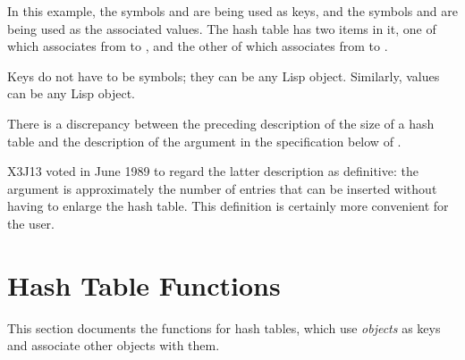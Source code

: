 In this example, the symbols  and  are being used as
keys, and the symbols  and  are being used as the
associated values.  The hash table has two items in it, one of which
associates from  to , and the other of which
associates from  to .

Keys do not have to be symbols; they can be any Lisp object.  Similarly,
values can be any Lisp object.

\begin{newer}
There is a discrepancy between the preceding description of the
size of a hash table and the description of the  argument
in the specification below
of .

X3J13 voted in June 1989  to regard the
latter description as definitive: the  argument
is approximately the number of entries that can be inserted
without having to enlarge the hash table.  This definition is certainly
more convenient for the user.
\end{newer}

\section{Hash Table Functions}

This section documents the functions for hash tables, which
use \emph{objects} as keys and associate other objects with them.

